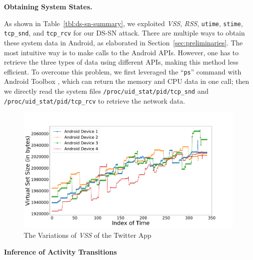 \documentclass[letterpaper,12pt]{article}
\begin{document}
\textbf{Obtaining System States.}

As shown in Table~\ref{tbl:ds-sn-summary}, we exploited \emph{VSS}, \emph{RSS}, \texttt{utime}, \texttt{stime}, \texttt{tcp\_snd}, and \texttt{tcp\_rcv} for our DS-SN attack. There are multiple ways to obtain these system data in Android, as elaborated in Section~\ref{sec:preliminaries}. The most intuitive way is to make calls to the Android APIs. However, one has to retrieve the three types of data using different APIs, making this method less efficient. To overcome this problem, we first leveraged the ``\texttt{ps}'' command with Android Toolbox \cite{toolbox}, which can return the memory and CPU data in one call; then we directly read the system files \texttt{/proc/uid\_stat/pid/tcp\_snd} and  \texttt{/proc/uid\_stat/pid/tcp\_rcv} to retrieve the network data. 

\begin{figure}[!htb]
  \includegraphics[width=\textwidth]{swipe.pdf}
  \caption{The Variations of \emph{VSS} of the Twitter App}
  \label{fig:swipe}
\end{figure}


\textbf{Inference of Activity Transitions}
\end{document}
